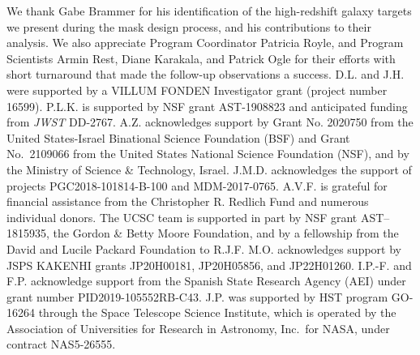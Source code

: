 \documentclass[twocolumn]{aastex631}
\begin{document}
\begin{acknowledgments}
We thank Gabe Brammer for his identification of the high-redshift galaxy targets we present during the mask design process, and his contributions to their analysis. We also appreciate Program Coordinator Patricia Royle, and Program Scientists Armin Rest, Diane Karakala, and Patrick Ogle for their efforts with short turnaround that made the follow-up observations a success. D.L. and J.H. were supported by a VILLUM FONDEN Investigator grant (project number 16599).
P.L.K. is supported by NSF grant AST-1908823 and anticipated funding from {\it JWST} DD-2767. %
A.Z. acknowledges support by Grant No. 2020750 from the United States-Israel Binational Science Foundation (BSF) and Grant No.\ 2109066 from the United States National Science Foundation (NSF), and by the Ministry of Science \& Technology, Israel.
J.M.D. acknowledges the support of projects PGC2018-101814-B-100 and MDM-2017-0765. 
A.V.F. is grateful for financial assistance from the Christopher R. Redlich Fund and numerous individual donors.  
The UCSC team is supported in part by NSF grant AST--1815935, the Gordon \& Betty Moore Foundation, and by a fellowship from the David and Lucile Packard Foundation to R.J.F.
M.O. acknowledges support by JSPS KAKENHI grants JP20H00181, JP20H05856, and JP22H01260.
I.P.-F. and F.P. acknowledge support from the Spanish State Research Agency (AEI) under grant number PID2019-105552RB-C43.
J.P. was supported by HST program GO-16264 through the Space Telescope Science Institute, which is operated by the Association of Universities for Research in Astronomy, Inc.\ for NASA, under contract NAS5-26555.
\end{acknowledgments}



\end{document}

